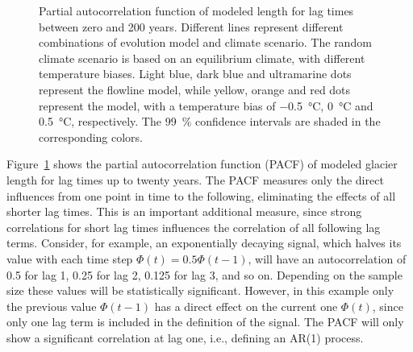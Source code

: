 \begin{figure}[htp]
        \caption{Partial autocorrelation function of modeled length for lag times between zero and 200 years. Different lines represent different combinations of evolution model and climate scenario.
        The random climate scenario is based on an equilibrium climate, with different temperature biases.
        Light blue, dark blue and ultramarine dots represent the flowline model, while yellow, orange and red dots represent the \vas{} model, with a temperature bias of \SI{-.5}{\celsius}, \SI{0}{\celsius} and \SI{+.5}{\celsius}, respectively.
        The \SI{99}{\percent} confidence intervals are shaded in the corresponding colors.}
        \label{fig:pacf}
      \end{figure}

      Figure~\ref{fig:pacf} shows the partial autocorrelation function (PACF) of modeled glacier length for lag times up to twenty years. The PACF measures only the direct influences from one point in time to the following, eliminating the effects of all shorter lag times. This is an important additional measure, since strong correlations for short lag times influences the correlation of all following lag terms. Consider, for example, an exponentially decaying signal, which halves its value with each time step $\Phi(t) = 0.5 \Phi(t-1)$, will have an autocorrelation of 0.5 for lag 1, 0.25 for lag 2, 0.125 for lag 3, and so on. Depending on the sample size these values will be statistically significant. However, in this example only the previous value $\Phi(t-1)$ has a direct effect on the current one $\Phi(t)$, since only one lag term is included in the definition of the signal. The PACF will only show a significant correlation at lag one, i.e., defining an AR(1) process.

